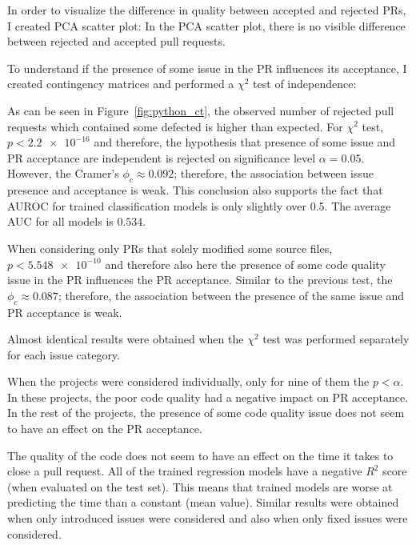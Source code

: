 \documentclass[digital,oneside,oldtable,nolof,nolot,nocover]{fithesis4}
\begin{document}
In order to visualize the difference in quality between accepted and rejected PRs, I created PCA scatter plot:
In the PCA scatter plot, there is no visible difference between rejected and accepted pull requests.

To understand if the presence of some issue in the PR influences its acceptance, I created contingency matrices
and performed a \(\chi^2\) test of independence:

As can be seen in Figure~\ref{fig:python_ct}, the observed number of
rejected pull requests which contained some defected is higher than
expected. For \(\chi^2\) test, \(p < \num{2.2e-16}\) and therefore, the
hypothesis that presence of some issue and PR acceptance are independent is
rejected on significance level \(\alpha = 0.05\). However, the Cramer's \(\phi_c
   \approx 0.092\); therefore, the association between issue presence and acceptance is weak.
This conclusion also supports the fact that AUROC for trained classification models is only slightly over 0.5.
The average AUC for all models is \(0.534\).

When considering only PRs that solely modified some source files, \(p < \num{5.548e-10}\)
and therefore also here the presence of some code quality issue in the PR
influences the PR acceptance.
Similar to the previous test, the \(\phi_c \approx 0.087\); therefore, the
association between the presence of the same issue and PR acceptance is weak.

Almost identical results were obtained when the \(\chi^2\) test was performed separately for each issue category.

When the projects were considered individually, only for nine of them the \(p < \alpha\). In these projects,
the poor code quality had a negative impact on PR acceptance.
In the rest of the projects, the presence of some code quality issue does not seem to have an effect on
the PR acceptance.

The quality of the code does not seem to have an effect on the time it takes to close a pull request.
All of the trained regression models have a negative \(R^2\) score (when evaluated on the test set).
This means that trained models are worse at predicting the time than a constant (mean value).
Similar results were obtained when only introduced issues were considered and also when only
fixed issues were considered.
\end{document}

